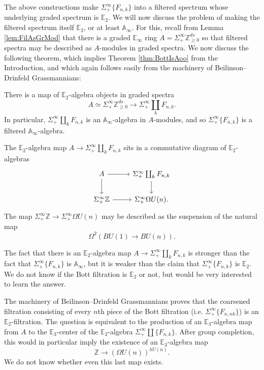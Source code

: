 The above constructions make $\Sigma^{\infty}_+ \{F_{n,k}\}$ into a filtered spectrum whose underlying graded spectrum is $\mathbb{E}_2$.  We will now discuss the problem of making the filtered spectrum itself $\mathbb{E}_2$, or at least $\mathbb{A}_\infty$.  For this, recall from Lemma \ref{lem:FilAsGrMod} that there is a graded $\mathbb{E}_\infty$ ring $A=\Sigma^{\infty}_+ \mathbb{Z}^{ds}_{\ge 0}$ so that filtered spectra may be described as $A$-modules in graded spectra.  We now discuss the following theorem, which implies Theorem \ref{thm:BottIsAoo} from the Introduction, and which again follows easily from the machinery of Beilinson--Drinfeld Grassmannians:

\begin{thm} \label{thm:AooFil}
There is a map of $\mathbb{E}_2$-algebra objects in graded spectra
$$A \simeq \Sigma^{\infty}_+ \mathbb{Z}^{ds}_{\ge 0} \longrightarrow \Sigma^{\infty}_+ \coprod_k F_{n,k}.$$
In particular, $\Sigma^{\infty}_+ \coprod_k F_{n,k}$ is an $\mathbb{A}_\infty$-algebra in $A$-modules, and so $\Sigma^{\infty}_+ \{F_{n,k}\}$ is a filtered $\mathbb{A}_\infty$-algebra.
\end{thm}

\begin{rmk}
The $\mathbb{E}_2$-algebra map $A \rightarrow \Sigma^{\infty}_+ \coprod_k F_{n,k}$ sits in a commutative diagram of $\mathbb{E}_2$-algebras
$$
\begin{tikzcd}
A \arrow{d} \arrow{r} & \Sigma^{\infty}_+ \coprod_k F_{n,k} \arrow{d} \\
\Sigma^{\infty}_+ \mathbb{Z} \arrow{r} & \Sigma^{\infty}_+ \Omega U(n).
\end{tikzcd}
$$
The map $\Sigma^{\infty}_+ \mathbb{Z} \rightarrow \Sigma^{\infty}_+ \Omega U(n)$ may be described as the suspension of the natural map
$$\Omega^2(BU(1) \rightarrow BU(n)).$$
\end{rmk}

\begin{rmk} \label{rmk:E2fil}
The fact that there is an $\mathbb{E}_2$-algebra map $A \rightarrow \Sigma^{\infty}_+ \coprod_k F_{n,k}$ is stronger than the fact that $\Sigma^{\infty}_+ \{F_{n,k}\}$ is $\mathbb{A}_\infty$, but it is weaker than the claim that $\Sigma^{\infty}_+ \{F_{n,k}\}$ is $\mathbb{E}_2$.  We do not know if the Bott filtration is $\mathbb{E}_2$ or not, but would be very interested to learn the answer.

The machinery of Beilinson--Drinfeld Grassmannians proves that the coarsened filtration consisting of every $n$th piece of the Bott filtration (i.e. $\Sigma^{\infty}_+ \{F_{n,nk}\}$) is an $\mathbb{E}_2$-filtration.  The question is equivalent to the production of an $\mathbb{E}_3$-algebra map from $A$ to the $\mathbb{E}_3$-center of the $\mathbb{E}_2$-algebra $\Sigma^{\infty}_+ \coprod \{F_{n,k}\}$. 
After group completion, this would in particular imply the existence of an $\mathbb{E}_3$-algebra map
$$\mathbb{Z} \longrightarrow (\Omega U(n))^{hU(n)}.$$
We do not know whether even this last map exists.
\end{rmk}


